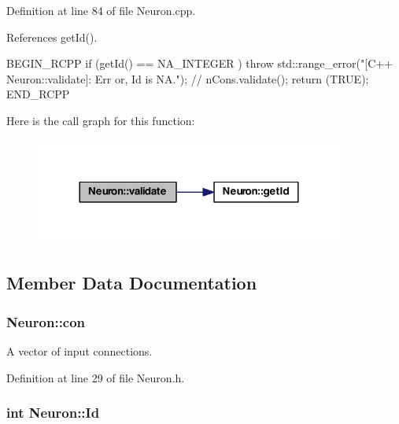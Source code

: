 Definition at line 84 of file Neuron.cpp.



References getId().


\begin{DoxyCode}
{
  BEGIN_RCPP
  if (getId() == NA_INTEGER ) throw std::range_error("[C++ Neuron::validate]: Err
      or, Id is NA.");
 // nCons.validate();
  return (TRUE);
END_RCPP}
\end{DoxyCode}


Here is the call graph for this function:
\nopagebreak
\begin{figure}[H]
\begin{center}
\leavevmode
\includegraphics[width=288pt]{class_neuron_a95327aa80a9ec949491f214a0c159b5a_cgraph}
\end{center}
\end{figure}




\subsection{Member Data Documentation}
\hypertarget{class_neuron_a1e92229eb19c3f322e118bdf23b9844e}{
\subsubsection[{con}]{ {\bf Neuron::con}}}
\label{class_neuron_a1e92229eb19c3f322e118bdf23b9844e}


A vector of input connections. 



Definition at line 29 of file Neuron.h.

\hypertarget{class_neuron_a72bb327a7c5c865e6748a4e074ce0680}{
\subsubsection[{Id}]{\setlength{\rightskip}{0pt plus 5cm}int {\bf Neuron::Id}}}
\label{class_neuron_a72bb327a7c5c865e6748a4e074ce0680}


